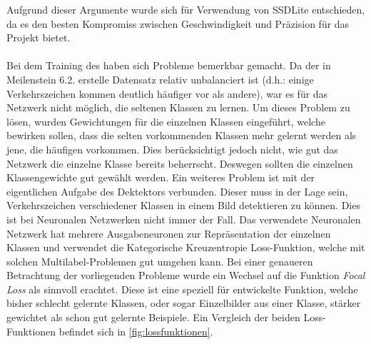 \documentclass[12pt,a4paper,ngerman,enabledeprecatedfontcommands]{scrreprt}
\begin{document}
Aufgrund dieser Argumente wurde sich für Verwendung von SSDLite\cite{DBLP:journals/corr/abs-1801-04381} entschieden, da es den besten Kompromiss zwischen Geschwindigkeit und Präzision für das Projekt bietet.\\
\\
Bei dem Training des  haben sich Probleme bemerkbar gemacht. Da der in Meilenstein 6.2. erstelle Datensatz relativ unbalanciert ist (d.h.: einige Verkehrszeichen kommen deutlich häufiger vor als andere), war es für das Netzwerk nicht möglich, die seltenen Klassen zu lernen. Um dieses Problem zu lösen, wurden Gewichtungen für die einzelnen Klassen eingeführt, welche bewirken sollen, dass die selten vorkommenden Klassen mehr gelernt werden als jene, die häufigen vorkommen. Dies berücksichtigt jedoch nicht, wie gut das Netzwerk die einzelne Klasse bereits beherrscht.
Deswegen sollten die einzelnen Klassengewichte gut gewählt werden.
Ein weiteres Problem ist mit der eigentlichen Aufgabe des Dektektors verbunden. Dieser muss in der Lage sein, Verkehrszeichen verschiedener Klassen in einem Bild detektieren zu können. Dies ist bei Neuronalen Netzwerken nicht immer der Fall. Das verwendete Neuronalen Netzwerk hat mehrere Ausgabeneuronen zur Repräsentation der einzelnen Klassen und verwendet die Kategorische Kreuzentropie Loss-Funktion, welche mit solchen \glqq{}Multilabel\grqq{}-Problemen gut umgehen kann. Bei einer genaueren Betrachtung der vorliegenden Probleme wurde ein Wechsel auf die Funktion \textit{\glqq{}Focal Loss\grqq{}} \cite{DBLP:journals/corr/abs-1708-02002} als sinnvoll erachtet. Diese ist eine speziell für  entwickelte Funktion, welche bisher schlecht gelernte Klassen, oder sogar Einzelbilder aus einer Klasse, stärker gewichtet als schon gut gelernte Beispiele. Ein Vergleich der beiden Loss-Funktionen befindet sich in \cref{fig:lossfunktionen}.\\
\end{document}
